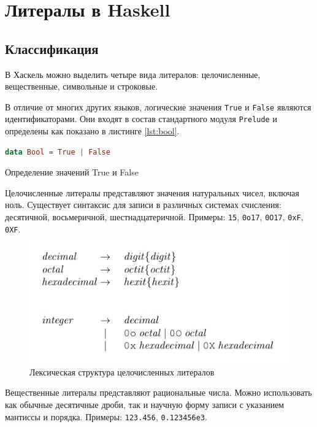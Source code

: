 \section{Литералы в Haskell}

\subsection{Классификация}

В Хаскель можно выделить четыре вида литералов: целочисленные, вещественные,
символьные и строковые.

В отличие от многих других языков, логические значения \texttt{True} и
\texttt{False} являются идентификаторами. Они входят в состав стандартного
модуля \texttt{Prelude} и определены как показано в листинге \ref{lst:bool}.

\begin{ListingEnv}
\begin{lstlisting}[language=Haskell]
data Bool = True | False
\end{lstlisting}
\caption{Определение значений True и False}
\label{lst:bool}
\end{ListingEnv}

Целочисленные литералы представляют значения натуральных чисел, включая ноль.
Существует синтаксис для записи в различных системах счисления: десятичной,
восьмеричной, шестнадцатеричной. Примеры: \texttt{15}, \texttt{0o17},
\texttt{0O17}, \texttt{0xF}, \texttt{0XF}.

\begin{figure}[H]
\centering
\includegraphics[scale=0.7]{pic-integral-literals}
\caption{Лексическая структура целочисленных литералов\cite{haskell2010}}
\end{figure}

Вещественные литералы представляют рациональные числа. Можно использовать как
обычные десятичные дроби, так и научную форму записи с указанием мантиссы и
порядка. Примеры: \texttt{123.456}, \texttt{0.123456e3}.

